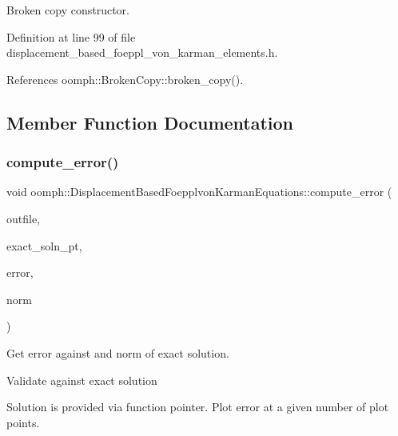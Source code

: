 Broken copy constructor. 



Definition at line 99 of file displacement\+\_\+based\+\_\+foeppl\+\_\+von\+\_\+karman\+\_\+elements.\+h.



References oomph\+::\+Broken\+Copy\+::broken\+\_\+copy().



\subsection{Member Function Documentation}
\mbox{\label{classoomph_1_1DisplacementBasedFoepplvonKarmanEquations_a25b1af4abda24f9e3ab73f04c0ded37c}} 
\subsubsection{\texorpdfstring{compute\+\_\+error()}{compute\_error()}\hspace{0.1cm}{\footnotesize\ttfamily [1/2]}}
{\footnotesize\ttfamily void oomph\+::\+Displacement\+Based\+Foepplvon\+Karman\+Equations\+::compute\+\_\+error (\begin{DoxyParamCaption}\item[{std\+::ostream \&}]{outfile,  }\item[{\hyperlink{classoomph_1_1FiniteElement_a690fd33af26cc3e84f39bba6d5a85202}{Finite\+Element\+::\+Steady\+Exact\+Solution\+Fct\+Pt}}]{exact\+\_\+soln\+\_\+pt,  }\item[{double \&}]{error,  }\item[{double \&}]{norm }\end{DoxyParamCaption})\hspace{0.3cm}{\ttfamily [virtual]}}



Get error against and norm of exact solution. 

Validate against exact solution

Solution is provided via function pointer. Plot error at a given number of plot points. 

